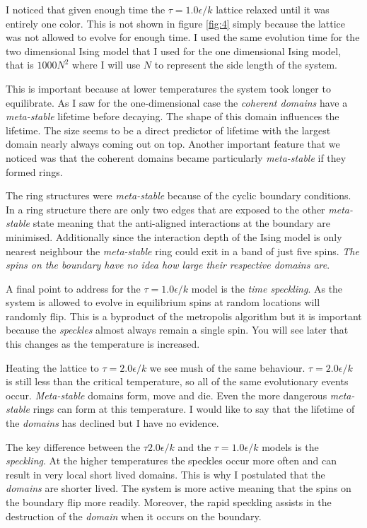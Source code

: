 \documentclass[a4paper, twocolumn]{article}
\begin{document}
I noticed that given enough time the \(\tau = 1.0 \epsilon / k\) lattice %
relaxed until it was entirely one color. This is not shown in figure %
\ref{fig:4} simply because the lattice was not allowed to evolve %
for enough time. I used the same evolution time for the two %
dimensional Ising model that I used for the one dimensional %
Ising model, that is \(1000N^{2}\) where I will use \(N\) to %
represent the side length of the system. 


This is important because at lower temperatures the system took longer %
to equilibrate. As I saw for the one-dimensional case the %
\emph{coherent domains} have a \emph{meta-stable} lifetime before decaying. %
The shape of this domain influences the lifetime. The size %
seems to be a direct predictor of lifetime with the largest %
domain nearly always coming out on top. Another important %
feature that we noticed was that the coherent domains became %
particularly \emph{meta-stable} if they formed rings. 


The ring structures were \emph{meta-stable} because of the cyclic %
boundary conditions. In a ring structure there are only two edges %
that are exposed to the other \emph{meta-stable} state meaning %
that the anti-aligned interactions at the boundary are minimised. %
Additionally since the interaction depth of the Ising model is %
only nearest neighbour the \emph{meta-stable} ring could exit %
in a band of just five spins. \emph{The spins on the boundary %
have no idea how large their respective domains are}.


A final point to address for the \(\tau = 1.0\epsilon / k\) model %
is the \emph{time speckling}. As the system is allowed to evolve %
in equilibrium spins at random locations will randomly flip. %
This is a byproduct of the metropolis algorithm but it is important %
because the \emph{speckles} almost always remain a single spin. %
You will see later that this changes as the temperature is increased. 


Heating the lattice to \(\tau = 2.0 \epsilon / k\) we see mush %
of the same behaviour. \(\tau = 2.0 \epsilon / k\) is still less %
than the critical temperature, so all of the same evolutionary %
events occur. \emph{Meta-stable} domains form, move and die. %
Even the more dangerous \emph{meta-stable} rings can form at %
this temperature. I would like to say that the lifetime of the %
\emph{domains} has declined but I have no evidence. 


The key difference between the \(\tau  2.0 \epsilon / k\) and the %
\(\tau = 1.0 \epsilon / k\) models is the \emph{speckling}. At %
the higher temperatures the speckles occur more often and can %
result in very local short lived domains. This is why I postulated %
that the \emph{domains} are shorter lived. The system is more %
active meaning that the spins on the boundary flip more readily. %
Moreover, the rapid speckling assists in the destruction of the %
\emph{domain} when it occurs on the boundary.
\end{document}
